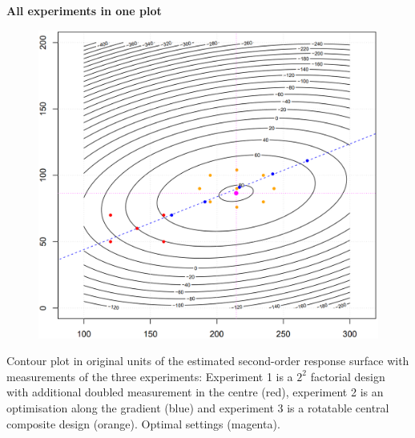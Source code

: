 \textbf{All experiments in one plot}\\
\begin{figure}[H]
  \centering
  \includegraphics[width=.6\linewidth]{Pics/15.2.3.png}
\end{figure}
Contour plot in original units of the estimated second-order response surface with measurements of the three experiments: Experiment 1 is a $2^2$ factorial design with additional doubled measurement in the centre (red), experiment 2 is an optimisation along the gradient (blue) and experiment 3 is a rotatable central composite design (orange). Optimal settings (magenta).
